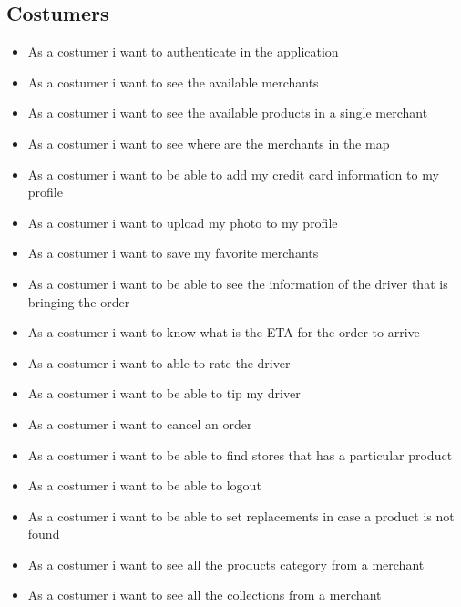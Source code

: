 \subsection{Costumers}
\begin{itemize}
    \item As a costumer i want to authenticate in the application
    \item As a costumer i want to see the available merchants
    \item As a costumer i want to see the available products in a single 
    merchant
    \item As a costumer i want to see where are the merchants in the map
    \item As a costumer i want to be able to add my credit card information 
    to my profile
    \item As a costumer i want to upload my photo to my profile
    \item As a costumer i want to save my favorite merchants
    \item As a costumer i want to be able to see the information of the driver 
    that is bringing the order
    \item As a costumer i want to know what is the ETA for the order to arrive
    \item As a costumer i want to able to rate the driver
    \item As a costumer i want to be able to tip my driver
    \item As a costumer i want to cancel an order
    \item As a costumer i want to be able to find stores that has a particular 
    product
    \item As a costumer i want to be able to logout
    \item As a costumer i want to be able to set replacements in case a product 
    is not found
    \item As a costumer i want to see all the products category from a merchant
    \item As a costumer i want to see all the collections from a merchant
\end{itemize}
